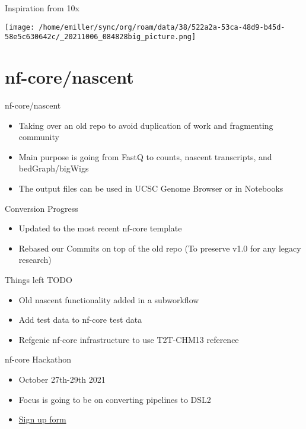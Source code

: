 \documentclass[bigger]{beamer}
\begin{document}
\begin{frame}[label={sec:org515f4d1}]{Inspiration from 10x}
\begin{center}
\texttt{[image: /home/emiller/sync/org/roam/data/38/522a2a-53ca-48d9-b45d-58e5c630642c/\_20211006\_084828big\_picture.png]}
\end{center}
\end{frame}


\section{nf-core/nascent}
\label{sec:org817e2a6}

\begin{frame}[label={sec:orgeef3de3}]{nf-core/nascent}
\begin{itemize}
\item Taking over an old repo to avoid duplication of work and fragmenting community
\item Main purpose is going from FastQ to counts, nascent transcripts, and
bedGraph/bigWigs
\item The output files can be used in UCSC Genome Browser or in Notebooks
\end{itemize}
\end{frame}

\begin{frame}[label={sec:orga373cf2}]{Conversion Progress}
\begin{itemize}
\item Updated to the most recent nf-core template
\item Rebased our Commits on top of the old repo (To preserve v1.0 for any legacy
research)
\end{itemize}
\end{frame}

\begin{frame}[label={sec:orgb9f2d43}]{Things left TODO}
\begin{itemize}
\item Old nascent functionality added in a subworkflow
\item Add test data to nf-core test data
\item Refgenie nf-core infrastructure to use T2T-CHM13 reference
\end{itemize}
\end{frame}

\begin{frame}[label={sec:org2125b59}]{nf-core Hackathon}
\begin{itemize}
\item October 27th-29th 2021
\item Focus is going to be on converting pipelines to DSL2
\item \href{https://nf-co.re/events/2021/hackathon-october-2021}{\alert{Sign up form}}
\end{itemize}
\end{frame}
\end{document}

